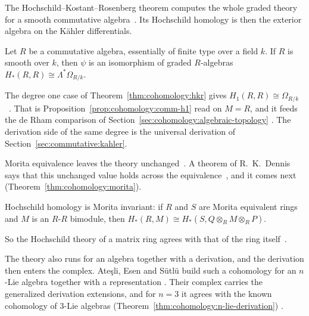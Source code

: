 The Hochschild--Kostant--Rosenberg theorem computes the whole graded theory for
a smooth commutative algebra~\cite[Theorem~9.4.7, pp.~322--323]{Weibel1994}. Its
Hochschild homology is then the exterior algebra on the Kähler differentials.

\begin{theorem}\label{thm:cohomology:hkr}
Let $R$ be a commutative algebra, essentially of finite type over a field $k$. If
$R$ is smooth over $k$, then $\psi$ is an isomorphism of graded $R$-algebras
$H_*(R, R) \cong \Lambda^* \Omega_{R/k}$.
\end{theorem}

The degree one case of Theorem~\ref{thm:cohomology:hkr} gives
$H_1(R, R) \cong \Omega_{R/k}$~\cite[Theorem~9.4.7, p.~322]{Weibel1994}. That
is Proposition~\ref{prop:cohomology:comm-h1} read on $M = R$, and it feeds the
de Rham comparison of
Section~\ref{sec:cohomology:algebraic-topology}
\cite[Theorem~9.8.13, p.~351]{Weibel1994}. The derivation side of the same
degree is the universal derivation of
Section~\ref{sec:commutative:kahler}. %

Morita equivalence leaves the theory
unchanged~\cite[Theorem~9.5.6, p.~325]{Weibel1994}. A theorem of R.~K.~Dennis
says that this unchanged value holds across the
equivalence~\cite[Theorem~9.5.6, p.~325]{Weibel1994}, and it comes next (Theorem~\ref{thm:cohomology:morita}).

\begin{theorem}\label{thm:cohomology:morita}
Hochschild homology is Morita invariant: if $R$ and $S$ are Morita equivalent
rings and $M$ is an $R$-$R$ bimodule, then
$H_*(R, M) \cong H_*(S, Q \otimes_R M \otimes_R P)$.
\end{theorem}

So the Hochschild theory of a matrix ring agrees with that of the ring
itself~\cite[Theorem~9.5.6, p.~325]{Weibel1994}.

The theory also runs for an algebra together with a derivation, and the
derivation then enters the complex. Ate\c{s}li, Esen and S\"utl\"u build such
a cohomology for an $n$-Lie algebra together with a representation
\cite[p.~2]{AtesliEsenSutlu2021}. Their complex carries the generalized
derivation extensions, and for $n=3$ it agrees with the known cohomology of
$3$-Lie algebras (Theorem~\ref{thm:cohomology:n-lie-derivation}) \cite[p.~1]{AtesliEsenSutlu2021}.

